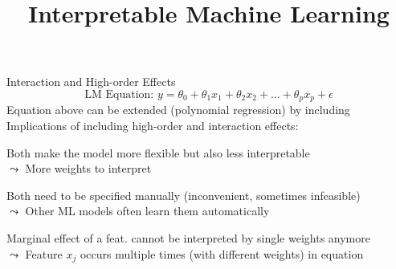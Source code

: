 \documentclass[10pt,compress,t,notes=noshow, xcolor=table]{beamer}
\title{Interpretable Machine Learning}
\begin{document}


\begin{framev}[align=top]{Interaction and High-order Effects}
$$\text{LM Equation: } y = \theta_0 + \theta_1 x_1 + \theta_2 x_2 + \dots + \theta_p x_p + \epsilon$$
Equation above can be extended (polynomial regression) by including
\pause\\
\spacer[0.25]
Implications of including high-order and interaction effects:
\begin{itemizeM}
\item Both make the model more flexible but also less interpretable\\
$\leadsto$ More weights to interpret
\item Both need to be specified manually (inconvenient, sometimes infeasible)\\
$\leadsto$ Other ML models often learn them automatically
\item Marginal effect of a feat. cannot be interpreted by single weights anymore\\
$\leadsto$ Feature $x_j$ occurs multiple times (with different weights) in equation
\end{itemizeM}

\end{framev}
\end{document}
